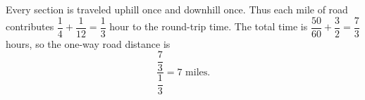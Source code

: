 Every section is traveled uphill once and downhill once. Thus each mile of road contributes $\dfrac{1}{4}+\dfrac{1}{12}=\dfrac{1}{3}$ hour to the round-trip time. The total time is $\dfrac{50}{60}+\dfrac{3}{2}=\dfrac{7}{3}$ hours, so the one-way road distance is
\[
\boxed{\dfrac{\dfrac{7}{3}}{\dfrac{1}{3}}=7\text{ miles}}.
\]
